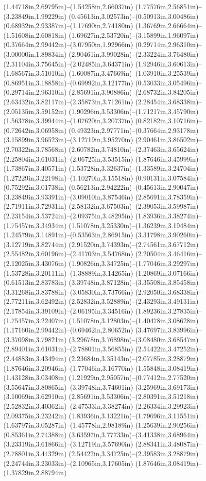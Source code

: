 (1.44718in,2.69795in)--(1.54258in,2.66037in) (1.77576in,2.56851in)--(3.23849in,1.99229in) (0.45613in,3.02573in)--(0.50913in,3.00486in) (0.68932in,2.93387in)--(1.17690in,2.74180in) (1.36769in,2.66664in)--(1.51608in,2.60818in) (1.69627in,2.53720in)--(3.15899in,1.96097in) (0.37664in,2.99442in)--(3.07950in,1.92966in) (0.29714in,2.96310in)--(3.00000in,1.89834in) (2.90461in,3.99028in)--(2.33224in,3.76480in) (2.31104in,3.75645in)--(2.02485in,3.64371in) (1.92946in,3.60613in)--(1.68567in,3.51010in) (1.60087in,3.47669in)--(1.03910in,3.25539in) (0.86951in,3.18858in)--(0.69992in,3.12177in) (0.53033in,3.05496in)--(0.29714in,2.96310in) (2.85691in,3.90886in)--(2.68732in,3.84205in) (2.63432in,3.82117in)--(2.35873in,3.71261in) (2.28454in,3.68338in)--(2.05135in,3.59152in) (1.90296in,3.53306in)--(1.71217in,3.45790in) (1.56378in,3.39944in)--(1.07620in,3.20737in) (0.82182in,3.10716in)--(0.72642in,3.06958in) (0.49323in,2.97771in)--(0.37664in,2.93178in) (3.15899in,3.96523in)--(3.12719in,3.95270in) (2.90461in,3.86502in)--(2.70322in,3.78568in) (2.60782in,3.74810in)--(2.37463in,3.65624in) (2.25804in,3.61031in)--(2.06725in,3.53515in) (1.87646in,3.45999in)--(1.73867in,3.40571in) (1.53728in,3.32637in)--(1.33589in,3.24704in) (1.27229in,3.22198in)--(1.10270in,3.15518in) (0.90131in,3.07584in)--(0.75292in,3.01738in) (0.56213in,2.94222in)--(0.45613in,2.90047in) (3.23849in,3.93391in)--(3.09010in,3.87546in) (2.85691in,3.78359in)--(2.71911in,3.72931in) (2.58132in,3.67503in)--(2.39053in,3.59987in) (2.23154in,3.53724in)--(2.09375in,3.48295in) (1.83936in,3.38274in)--(1.75457in,3.34934in) (1.51078in,3.25330in)--(1.36239in,3.19484in) (1.24579in,3.14891in)--(0.53563in,2.86915in) (3.31798in,3.90260in)--(3.12719in,3.82744in) (2.91520in,3.74393in)--(2.74561in,3.67712in) (2.55482in,3.60196in)--(2.41703in,3.54768in) (2.20504in,3.46416in)--(2.12025in,3.43076in) (1.90826in,3.34725in)--(1.77046in,3.29297in) (1.53728in,3.20111in)--(1.38889in,3.14265in) (1.20869in,3.07166in)--(0.61513in,2.83783in) (3.39748in,3.87128in)--(3.35508in,3.85458in) (3.31268in,3.83788in)--(3.05830in,3.73766in) (2.92050in,3.68338in)--(2.77211in,3.62492in) (2.52832in,3.52889in)--(2.43293in,3.49131in) (2.17854in,3.39109in)--(2.06195in,3.34516in) (1.89236in,3.27835in)--(1.75457in,3.22407in) (1.51078in,3.12803in)--(1.40478in,3.08628in) (1.17160in,2.99442in)--(0.69462in,2.80652in) (3.47697in,3.83996in)--(3.37098in,3.79821in) (3.29678in,3.76898in)--(3.08480in,3.68547in) (2.89401in,3.61031in)--(2.78801in,3.56855in) (2.54422in,3.47252in)--(2.44883in,3.43494in) (2.23684in,3.35143in)--(2.07785in,3.28879in) (1.87646in,3.20946in)--(1.77046in,3.16770in) (1.55848in,3.08419in)--(1.43128in,3.03408in) (1.21929in,2.95057in)--(0.77412in,2.77520in) (3.55647in,3.80865in)--(3.39748in,3.74601in) (3.25969in,3.69173in)--(3.10069in,3.62910in) (2.85691in,3.53306in)--(2.80391in,3.51218in) (2.52832in,3.40362in)--(2.47533in,3.38274in) (2.26334in,3.29923in)--(2.09375in,3.23242in) (1.83936in,3.13221in)--(1.79696in,3.11551in) (1.63797in,3.05287in)--(1.45778in,2.98189in) (1.25639in,2.90256in)--(0.85361in,2.74388in) (3.63597in,3.77733in)--(3.41338in,3.68964in) (3.23319in,3.61866in)--(3.12719in,3.57690in) (2.88341in,3.48087in)--(2.78801in,3.44329in) (2.54422in,3.34725in)--(2.39583in,3.28879in) (2.24744in,3.23033in)--(2.10965in,3.17605in) (1.87646in,3.08419in)--(1.37829in,2.88794in) 